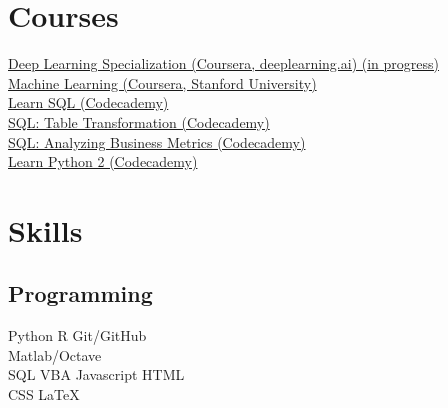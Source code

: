 \documentclass[]{cv}
\begin{document}
\begin{minipage}[t]{0.33\textwidth}

\section{Courses}
\href{https://www.coursera.org/specializations/deep-learning}{Deep Learning Specialization (Coursera, deeplearning.ai) (in progress)} \\
\href{https://www.coursera.org/learn/machine-learning}{Machine Learning (Coursera, Stanford University)} \\
\href{https://www.codecademy.com/learn/learn-sql}{Learn SQL (Codecademy)} \\
\href{https://www.codecademy.com/learn/sql-table-transformation}{SQL: Table Transformation (Codecademy)} \\
\href{https://www.codecademy.com/learn/sql-analyzing-business-metrics}{SQL: Analyzing Business Metrics (Codecademy)} \\
\href{https://www.codecademy.com/learn/learn-python}{Learn Python 2 (Codecademy)} \\
\sectionsep



\section{Skills}
\subsection{Programming}
Python \textbullet{}   R \textbullet{} Git/GitHub \\
Matlab/Octave\\ 
SQL \textbullet{} VBA \textbullet{} Javascript \textbullet{} HTML \\
CSS \textbullet{} \LaTeX\
\sectionsep

%
%

\end{minipage} 
\end{document}
